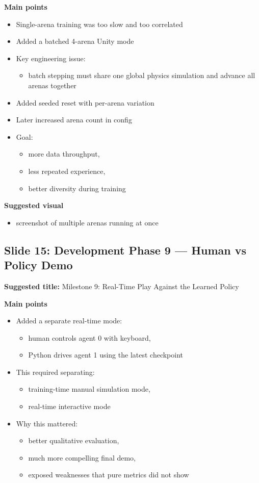 \documentclass[11pt]{article}
\begin{document}
\textbf{Main points}
\begin{itemize}
    \item Single-arena training was too slow and too correlated
    \item Added a batched 4-arena Unity mode
    \item Key engineering issue:
    \begin{itemize}
        \item batch stepping must share one global physics simulation and advance all arenas together
    \end{itemize}
    \item Added seeded reset with per-arena variation
    \item Later increased arena count in config
    \item Goal:
    \begin{itemize}
        \item more data throughput,
        \item less repeated experience,
        \item better diversity during training
    \end{itemize}
\end{itemize}

\textbf{Suggested visual}
\begin{itemize}
    \item screenshot of multiple arenas running at once
\end{itemize}

\subsection*{Slide 15: Development Phase 9 --- Human vs Policy Demo}

\textbf{Suggested title:} Milestone 9: Real-Time Play Against the Learned Policy

\textbf{Main points}
\begin{itemize}
    \item Added a separate real-time mode:
    \begin{itemize}
        \item human controls agent 0 with keyboard,
        \item Python drives agent 1 using the latest checkpoint
    \end{itemize}
    \item This required separating:
    \begin{itemize}
        \item training-time manual simulation mode,
        \item real-time interactive mode
    \end{itemize}
    \item Why this mattered:
    \begin{itemize}
        \item better qualitative evaluation,
        \item much more compelling final demo,
        \item exposed weaknesses that pure metrics did not show
    \end{itemize}
\end{itemize}
\end{document}
